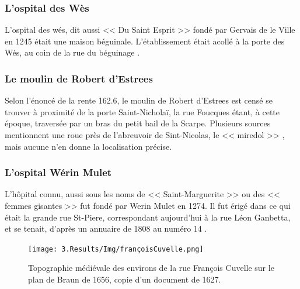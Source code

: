 \subsubsection{L'ospital des Wès}
L'ospital des wés, dit aussi << Du Saint Esprit >> fondé par Gervais de le Ville en 1245  était une maison béguinale. L’établissement était acollé à la porte des Wés, au coin de la rue du béguinage \parencite{brassart_notes_1842}.

\subsubsection{Le moulin de Robert d'Estrees}
Selon l'énoncé de la rente 162.6, le moulin de Robert d'Estrees est censé se trouver à proximité de la porte Saint-Nicholaï, la rue Foucques étant, à cette époque, traversée par un bras du petit bail de la Scarpe. Plusieurs sources mentionnent une roue près de  l'abreuvoir de Sint-Nicolas, le  << miredol >> \parencite{lohrmann_entre_1984,brassart_memoire_1862,colin_decouvrez_2001}, mais aucune n'en donne la localisation précise.

\subsubsection{L'ospital Wérin Mulet}
L'hôpital connu, aussi sous les noms de << Saint-Marguerite >> ou des << femmes gisantes >> fut fondé par Werin Mulet en 1274. Il fut érigé dans ce qui était la grande rue St-Piere, correspondant aujourd'hui à la rue Léon Ganbetta, et se tenait, d'après un annuaire  de 1808  au numéro 14 \parencite{brassart_notes_1842}.

\begin{figure}
    \centering
    \texttt{[image: 3.Results/Img/françoisCuvelle.png]}
    \caption{Topographie médiévale des environs de la rue François Cuvelle sur le plan de Braun de 1656, copie d’un document de 1627.}
    \label{fig:françoiscuvelle}
\end{figure}

